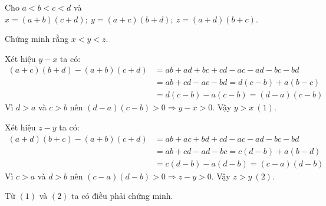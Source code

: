 \begin{problem}
	Cho $a < b < c < d$ và $x = (a + b)(c + d);\ y = (a + c)(b + d);\ z = (a + d)(b + c)$.

	Chứng minh rằng $x < y < z$.

	\solution
	
	Xét hiệu $y - x$ ta có:
	\begin{align*}
		(a + c)(b + d) - (a + b)(c + d) &= ab + ad + bc + cd - ac - ad - bc - bd \\
		&= ab + cd - ac - bd = d(c - b) + a(b - c) \\
		&= d(c - b) - a(c - b) = (d - a)(c - b)
	\end{align*}
	Vì $d > a$ và $c > b$ nên $(d - a)(c - b) > 0 \Rightarrow y - x > 0$.
	Vậy $y > x \ (1)$.

	Xét hiệu $z - y$ ta có:
	\begin{align*}
		(a + d)(b + c) - (a + b)(c + d) &= ab + ac + bd + cd - ac - ad - bc - bd \\ 
		&= ab + cd - ad - bc = c(d - b) + a(b - d) \\
		&= c(d - b) - a(d - b) = (c - a)(d - b)
	\end{align*}
	Vì $c > a$ và $d > b$ nên $(c - a)(d - b) > 0 \Rightarrow z - y > 0$.
	Vậy $z > y \ (2)$.

	Từ $(1)$ và $(2)$ ta có điều phải chứng minh.
\end{problem}